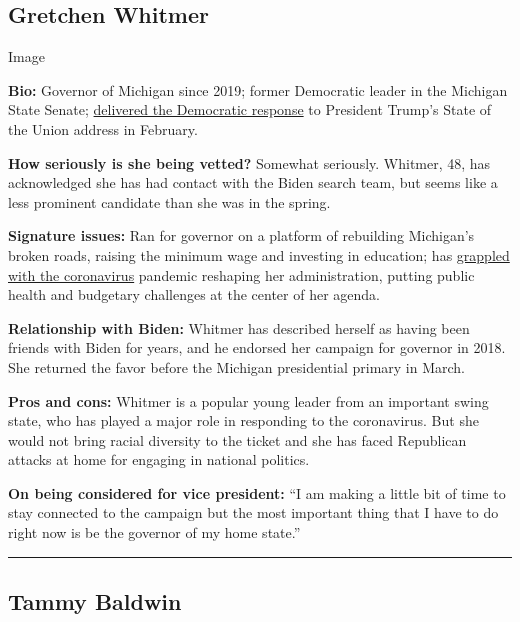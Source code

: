 \hypertarget{gretchen-whitmer}{%
\subsection{Gretchen Whitmer}\label{gretchen-whitmer}}

Image

\textbf{Bio:} Governor of Michigan since 2019; former Democratic leader
in the Michigan State Senate;
\href{https://www.nytimes3xbfgragh.onion/2020/02/04/us/politics/gretchen-whitmer-state-of-the-union.html}{delivered
the Democratic response} to President Trump's State of the Union address
in February.

\textbf{How seriously is she being vetted?} Somewhat seriously. Whitmer,
48, has acknowledged she has had contact with the Biden search team, but
seems like a less prominent candidate than she was in the spring.

\textbf{Signature issues:} Ran for governor on a platform of rebuilding
Michigan's broken roads, raising the minimum wage and investing in
education; has
\href{https://www.nytimes3xbfgragh.onion/2020/04/18/us/politics/gretchen-whitmer-michigan-protests.html}{grappled
with the coronavirus} pandemic reshaping her administration, putting
public health and budgetary challenges at the center of her agenda.

\textbf{Relationship with Biden:} Whitmer has described herself as
having been friends with Biden for years, and he endorsed her campaign
for governor in 2018. She returned the favor before the Michigan
presidential primary in March.

\textbf{Pros and cons:} Whitmer is a popular young leader from an
important swing state, who has played a major role in responding to the
coronavirus. But she would not bring racial diversity to the ticket and
she has faced Republican attacks at home for engaging in national
politics.

\textbf{On being considered for vice president:} ``I am making a little
bit of time to stay connected to the campaign but the most important
thing that I have to do right now is be the governor of my home state.''

\begin{center}\rule{0.5\linewidth}{\linethickness}\end{center}

\hypertarget{tammy-baldwin}{%
\subsection{Tammy Baldwin}\label{tammy-baldwin}}

